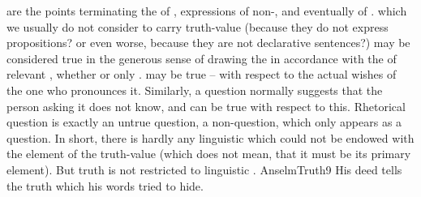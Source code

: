 \pa\label{pa:truthAll}
 are the  points terminating the  of
,  expressions of non-, and eventually
of . 
 which we usually do not consider to carry
truth-value (because they do not express propositions? or even worse, because
they are not declarative sentences?) may be
considered true in the generous sense of drawing the  in
accordance with the  of relevant , whether
 or only .   may be true 
-- with respect to the actual wishes of
the one who pronounces it. Similarly, a question %
normally suggests that the person asking it does not know, and can
be true with respect to this. Rhetorical question is exactly an untrue question,
a non-question, which only appears as a question. In short, there is hardly any
linguistic  which could not be endowed with the element of the
truth-value (which does not mean, that it must be its primary element). But
truth is not restricted to linguistic . 
\citet{If you were in a place where you knew that there were both healthy and
  poisonous herbs, though you did not know how to distinguish between them, but
there was someone else there whom you did not doubt knew how to distinguish
them, and when you asked him he told you which were the healthy and which
poisonous, and he told you that some were healthy yet he himself ate others,
which would you believe, his word or his deed?}{AnselmTruth}{9} His deed tells
the truth which his words tried to hide. 

